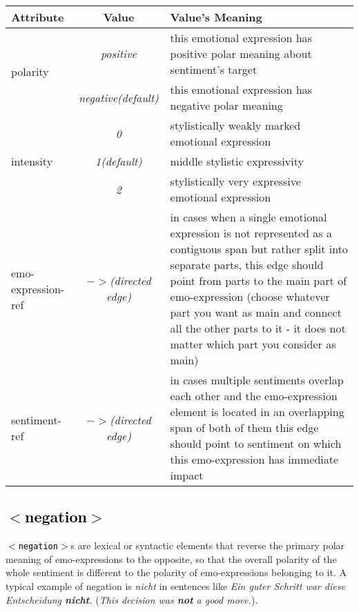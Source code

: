 \documentclass[11pt,a4paper]{article}
\newcommand{\xmltag}[1]{\textcolor{black}{{\small$<$#1$>$}}}
\begin{document}
\begin{tabular}{|l|c|p{}|}\hline
  Attribute & Value & Value's Meaning\\\hline

  \multirow{2}{*}{polarity} & \textit{positive} & this emotional
  expression has positive polar meaning about sentiment's
  target\\\cline{2-3}

  & \textit{negative\newline(default)} & this emotional expression has
  negative polar meaning\\\hline


  \multirow{3}{*}{intensity} & \textit{0} & stylistically weakly
  marked emotional expression\\\cline{2-3}

  & \textit{1\newline(default)} & middle stylistic
  expressivity\\\cline{2-3}

  & \textit{2} & stylistically very expressive emotional
  expression\\\hline


  emo-expression-ref & \textit{$->$\newline(directed edge)} & in cases
  when a single emotional expression is not represented as a
  contiguous span but rather split into separate parts, this edge
  should point from parts to the main part of emo-expression (choose
  whatever part you want as main and connect all the other parts to it
  - it does not matter which part you consider as main)\\\hline


  sentiment-ref & \textit{$->$\newline(directed edge)} & in cases
  multiple sentiments overlap each other and the emo-expression
  element is located in an overlapping span of both of them this edge
  should point to sentiment on which this emo-expression has immediate
  impact\\\hline
\end{tabular}


\subsection{\xmltag{negation}}
\texttt{\xmltag{negation}}s are lexical or syntactic elements that
reverse the primary polar meaning of emo-expressions to the opposite,
so that the overall polarity of the whole sentiment is different to
the polarity of emo-expressions belonging to it. A typical example of
negation is \textit{nicht} in sentences like \textit{Ein guter Schritt
  war diese Entscheidung \textbf{nicht}.} (\textit{This decision was
  \textbf{not} a good move.}).
\end{document}
